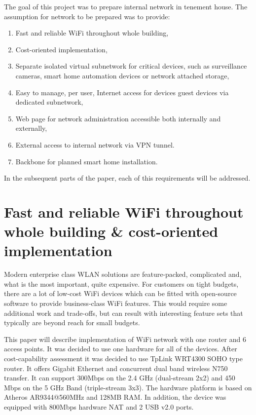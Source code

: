 \documentclass{llncs}
\begin{document}
The goal of this project was to prepare internal network in tenement house. The
assumption for network to be prepared was to provide:

\begin{enumerate}
  \item Fast and reliable WiFi throughout whole building,
  \item Cost-oriented implementation,
  \item Separate isolated virtual subnetwork for critical devices,
such as surveillance cameras, smart home automation devices or network attached
storage,
  \item Easy to manage, per user, Internet access for devices guest devices via
  dedicated subnetwork,
  \item Web page for network administration accessible both internally and
  externally,
  \item External access to internal network via VPN tunnel.
  \item Backbone for planned smart home installation.
\end{enumerate}

In the subsequent parts of the paper, each of this requirements will be addressed.

\section{Fast and reliable WiFi throughout whole building \& cost-oriented implementation}
Modern enterprise class WLAN solutions are feature-packed, complicated and, what is the most important, quite expensive. For customers on tight budgets, there are a lot of low-cost WiFi devices which can be fitted with open-source software to provide business-class WiFi features. This would require some additional work and trade-offs, but can result with interesting feature sets that typically are beyond reach for small budgets.

This paper will describe implementation of WiFi network with one router and 6 access points. It was decided to use one hardware for all of the devices. After cost-capability assessment it was decided to use TpLink WRT4300 SOHO type router. It offers Gigabit Ethernet and concurrent dual band wireless N750 transfer. It can support 300Mbps on the 2.4 GHz (dual-stream 2x2) and 450 Mbps on the 5 GHz Band (triple-stream 3x3). The hardware platform is based on Atheros AR9344@560MHz and 128MB RAM. In addition, the device was equipped with 800Mbps hardware NAT and 2 USB v2.0 ports. 
\end{document}
